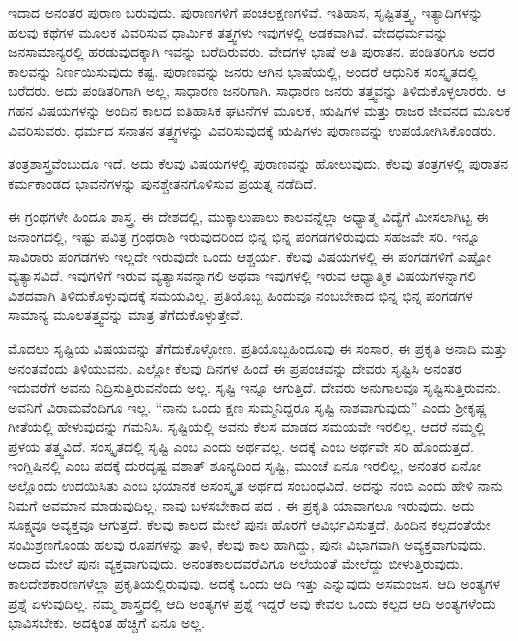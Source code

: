 ಇದಾದ ಅನಂತರ ಪುರಾಣ ಬರುವುದು. ಪುರಾಣಗಳಿಗೆ ಪಂಚಲಕ್ಷಣಗಳಿವೆ. ಇತಿಹಾಸ, ಸೃಷ್ಟಿತತ್ತ್ವ, ಇತ್ಯಾದಿಗಳನ್ನು ಹಲವು ಕಥೆಗಳ ಮೂಲಕ ವಿವರಿಸುವ ಧಾರ್ಮಿಕ ತತ್ತ್ವಗಳು ಇವುಗಳಲ್ಲಿ ಅಡಕವಾಗಿವೆ. ವೇದಧರ್ಮವನ್ನು ಜನ\-ಸಾಮಾನ್ಯ\-ರಲ್ಲಿ ಹರಡುವುದಕ್ಕಾಗಿ ಇವನ್ನು ಬರೆದಿರುವರು. ವೇದಗಳ ಭಾಷೆ ಅತಿ ಪುರಾತನ. ಪಂಡಿತರಿಗೂ ಅದರ ಕಾಲವನ್ನು ನಿರ್ಣಯಿಸುವುದು ಕಷ್ಟ. ಪುರಾಣವನ್ನು ಜನರು ಆಗಿನ ಭಾಷೆಯಲ್ಲಿ, ಅಂದರೆ ಆಧುನಿಕ ಸಂಸ್ಕೃತದಲ್ಲಿ ಬರೆದರು. ಅದು ಪಂಡಿತರಿಗಾಗಿ ಅಲ್ಲ, ಸಾಧಾರಣ ಜನರಿಗಾಗಿ. ಸಾಧಾರಣ ಜನರು ತತ್ತ್ವವನ್ನು ತಿಳಿದುಕೊಳ್ಳಲಾರರು. ಆ ಗಹನ ವಿಷಯಗಳನ್ನು ಅಂದಿನ ಕಾಲದ ಐತಿಹಾಸಿಕ ಘಟನೆಗಳ ಮೂಲಕ, ಋಷಿಗಳ ಮತ್ತು ರಾಜರ ಜೀವನದ ಮೂಲಕ ವಿವರಿಸುವರು. ಧರ್ಮದ ಸನಾತನ ತತ್ತ್ವಗಳನ್ನು ವಿವರಿಸುವುದಕ್ಕೆ ಋಷಿಗಳು ಪುರಾಣವನ್ನು ಉಪಯೋಗಿಸಿಕೊಂಡರು. 

ತಂತ್ರಶಾಸ್ತ್ರವೆಂಬುದೂ ಇದೆ. ಅದು ಕೆಲವು ವಿಷಯಗಳಲ್ಲಿ ಪುರಾಣವನ್ನು ಹೋಲುವುದು. ಕೆಲವು ತಂತ್ರಗಳಲ್ಲಿ ಪುರಾತನ ಕರ್ಮಕಾಂಡದ ಭಾವನೆಗಳನ್ನು ಪುನಶ್ಚೇತನಗೊಳಿಸುವ ಪ್ರಯತ್ನ ನಡೆದಿದೆ. 

ಈ ಗ್ರಂಥಗಳೇ ಹಿಂದೂ ಶಾಸ್ತ್ರ. ಈ ದೇಶದಲ್ಲಿ, ಮುಕ್ಕಾಲುಪಾಲು ಕಾಲವನ್ನೆಲ್ಲಾ ಅಧ್ಯಾತ್ಮ ವಿದ್ಯೆಗೆ ಮೀಸಲಾಗಿಟ್ಟ ಈ ಜನಾಂಗದಲ್ಲಿ, ಇಷ್ಟು ಪವಿತ್ರ ಗ್ರಂಥರಾಶಿ ಇರುವುದರಿಂದ ಭಿನ್ನ ಭಿನ್ನ ಪಂಗಡಗಳಿರುವುದು ಸಹಜವೇ ಸರಿ. ಇನ್ನೂ ಸಾವಿರಾರು ಪಂಗಡಗಳು ಇಲ್ಲದೇ ಇರುವುದೇ ಒಂದು ಆಶ್ಚರ್ಯ. ಕೆಲವು ವಿಷಯಗಳಲ್ಲಿ ಈ ಪಂಗಡಗಳಿಗೆ ಎಷ್ಟೋ ವ್ಯತ್ಯಾಸವಿದೆ. ಇವುಗಳಿಗೆ ಇರುವ ವ್ಯತ್ಯಾಸವನ್ನಾಗಲಿ ಅಥವಾ ಇವುಗಳಲ್ಲಿ ಇರುವ ಆಧ್ಯಾತ್ಮಿಕ ವಿಷಯಗಳನ್ನಾಗಲಿ ವಿಶದವಾಗಿ ತಿಳಿದುಕೊಳ್ಳುವುದಕ್ಕೆ ಸಮಯವಿಲ್ಲ. ಪ್ರತಿಯೊಬ್ಬ ಹಿಂದುವೂ ನಂಬಬೇಕಾದ ಭಿನ್ನ ಭಿನ್ನ ಪಂಗಡಗಳ ಸಾಮಾನ್ಯ ಮೂಲತತ್ತ್ವವನ್ನು ಮಾತ್ರ ತೆಗೆದುಕೊಳ್ಳುತ್ತೇವೆ. 

ಮೊದಲು ಸೃಷ್ಟಿಯ ವಿಷಯವನ್ನು ತೆಗೆದುಕೊಳ್ಳೋಣ. ಪ್ರತಿಯೊಬ್ಬ\break ಹಿಂದೂವು ಈ ಸಂಸಾರ, ಈ ಪ್ರಕೃತಿ ಅನಾದಿ ಮತ್ತು ಅನಂತವೆಂದು ತಿಳಿಯುವನು. ಎಲ್ಲೋ ಕೆಲವು ದಿನಗಳ ಹಿಂದೆ ಈ ಪ್ರಪಂಚವನ್ನು ದೇವರು ಸೃಷ್ಟಿಸಿ ಅನಂತರ ಇದುವರೆಗೆ ಅವನು ನಿದ್ರಿಸುತ್ತಿರುವನೆಂದು ಅಲ್ಲ. ಸೃಷ್ಟಿ ಇನ್ನೂ ಆಗುತ್ತಿದೆ. ದೇವರು ಅನುಗಾಲವೂ ಸೃಷ್ಟಿಸುತ್ತಿರುವನು. ಅವನಿಗೆ ವಿರಾಮವೆಂದಿಗೂ ಇಲ್ಲ. “ನಾನು ಒಂದು ಕ್ಷಣ ಸುಮ್ಮನಿದ್ದರೂ ಸೃಷ್ಟಿ ನಾಶವಾಗುವುದು” ಎಂದು ಶ‍್ರೀಕೃಷ್ಣ ಗೀತೆಯಲ್ಲಿ ಹೇಳುವುದನ್ನು ಗಮನಿಸಿ. ಸೃಷ್ಟಿಯಲ್ಲಿ ಅವನು ಕೆಲಸ ಮಾಡದ ಸಮಯವೇ ಇರಲಿಲ್ಲ. ಆದರೆ ನಮ್ಮಲ್ಲಿ ಪ್ರಳಯ ತತ್ತ್ವವಿದೆ. ಸಂಸ್ಕೃತದಲ್ಲಿ ಸೃಷ್ಟಿ ಎಂಬ  ಎಂದು ಅರ್ಥವಲ್ಲ. ಅದಕ್ಕೆ  ಎಂಬ ಅರ್ಥವೇ ಸರಿ ಹೊಂದುತ್ತದೆ. ಇಂಗ್ಲಿಷಿನಲ್ಲಿ  ಎಂಬ ಪದಕ್ಕೆ ದುರದೃಷ್ಟ ವಶಾತ್​ ಶೂನ್ಯದಿಂದ ಸೃಷ್ಟಿ, ಮುಂಚೆ ಏನೂ ಇರಲಿಲ್ಲ, ಅನಂತರ ಏನೋ ಅಲ್ಲೊಂದು ಉದಯಿಸಿತು ಎಂಬ ಭಯಾನಕ ಅಸಂಸ್ಕೃತ ಅರ್ಥದ ಸಂಬಂಧವಿದೆ. ಅದನ್ನು ನಂಬಿ ಎಂದು ಹೇಳಿ ನಾನು ನಿಮಗೆ ಅವಮಾನ ಮಾಡುವುದಿಲ್ಲ. ನಾವು ಬಳಸಬೇಕಾದ ಪದ . ಈ ಪ್ರಕೃತಿ ಯಾವಾಗಲೂ ಇರುವುದು. ಅದು ಸೂಕ್ಷ್ಮವೂ ಅವ್ಯಕ್ತವೂ ಆಗುತ್ತದೆ. ಕೆಲವು ಕಾಲದ ಮೇಲೆ ಪುನಃ ಹೊರಗೆ ಆವಿರ್ಭವಿಸುತ್ತದೆ. ಹಿಂದಿನ ಕಲ್ಪದಂತೆಯೇ ಸಂಮಿಶ್ರಣಗೊಂಡು ಹಲವು ರೂಪಗಳನ್ನು ತಾಳಿ, ಕೆಲವು ಕಾಲ ಹಾಗಿದ್ದು, ಪುನಃ ವಿಭಾಗವಾಗಿ ಅವ್ಯಕ್ತವಾಗುವುದು. ಅದಾದ ಮೇಲೆ ಪುನಃ ವ್ಯಕ್ತವಾಗುವುದು. ಅನಂತಕಾಲದವರೆವಿಗೂ ಅಲೆಯಂತೆ ಮೇಲೆದ್ದು ಬೀಳುತ್ತಿರುವುದು. ಕಾಲದೇಶಕಾರಣಗಳೆಲ್ಲಾ ಪ್ರಕೃತಿಯಲ್ಲಿರುವುವು. ಅದಕ್ಕೆ ಒಂದು ಆದಿ ಇತ್ತು ಎನ್ನುವುದು ಅಸಮಂಜಸ. ಆದಿ ಅಂತ್ಯಗಳ ಪ್ರಶ್ನೆ ಏಳುವುದಿಲ್ಲ. ನಮ್ಮ ಶಾಸ್ತ್ರದಲ್ಲಿ ಆದಿ ಅಂತ್ಯಗಳ ಪ್ರಶ್ನೆ ಇದ್ದರೆ ಅವು ಕೇವಲ ಒಂದು ಕಲ್ಪದ ಆದಿ ಅಂತ್ಯಗಳೆಂದು ಭಾವಿಸಬೇಕು. ಅದಕ್ಕಿಂತ ಹೆಚ್ಚಿಗೆ ಏನೂ ಅಲ್ಲ. 

